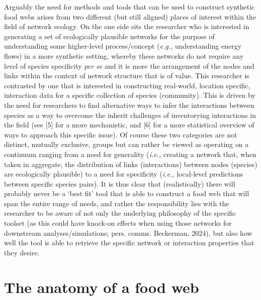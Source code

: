 \documentclass[
]{article}
\begin{document}
Arguably the need for methods and tools that can be used to construct
synthetic food webs arises from two different (but still aligned) places
of interest within the field of network ecology. On the one side sits
the researcher who is interested in generating a set of ecologically
plausible networks for the purpose of understanding some higher-level
process/concept (\emph{e.g.,} understanding energy flows) in a more
synthetic setting, whereby these networks do not require any level of
species specificity \emph{per se} and it is more the arrangement of the
nodes and links within the context of network structure that is of
value. This researcher is contrasted by one that is interested in
constructing real-world, location specific, interaction data for a
specific collection of species (community). This is driven by the need
for researchers to find alternative ways to infer the interactions
between species as a way to overcome the inherit challenges of
inventorying interactions in the field (see {[}5{]} for a more
mechanistic, and {[}6{]} for a more statistical overview of ways to
approach this specific issue). Of course these two categories are not
distinct, mutually exclusive, groups but can rather be viewed as
operating on a continuum ranging from a need for generality
(\emph{i.e.,} creating a network that, when taken in aggregate, the
distribution of links (interactions) between nodes (species) are
ecologically plausible) to a need for specificity (\emph{i.e.,}
local-level predictions between specific species pairs). It is thus
clear that (realistically) there will probably never be a `best fit'
tool that is able to construct a food web that will span the entire
range of needs, and rather the responsibility lies with the researcher
to be aware of not only the underlying philosophy of the specific
toolset (as this could have knock-on effects when using those networks
for downstream analyses/simulations; pers. comms. Beckerman, 2024), but
also how well the tool is able to retrieve the specific network or
interaction properties that they desire.

\section{The anatomy of a food web}\label{sec-network-anatomy}
\end{document}
